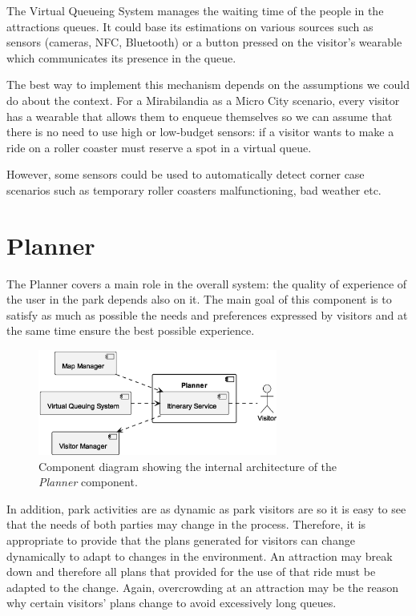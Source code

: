 The Virtual Queueing System manages the waiting time of the people in the attractions queues. It could base its estimations on various sources such
as sensors (cameras, NFC, Bluetooth) or a button pressed on the visitor's wearable which communicates its presence in the queue.

The best way to implement this mechanism depends on the assumptions we could do about the context.
For a Mirabilandia as a Micro City scenario, every visitor has a wearable that allows them to enqueue themselves so we can assume that there is no need to use high or low-budget sensors:
if a visitor wants to make a ride on a roller coaster must reserve a spot in a virtual queue.

However, some sensors could be used to automatically detect corner case scenarios such as temporary roller coasters malfunctioning, bad weather etc.

\section{Planner}\label{sec:planner}

The Planner covers a main role in the overall system: the quality of experience of the user in the park depends also on it. The main goal of this component is to satisfy as much as possible the needs and preferences expressed by visitors and at the same time ensure the best possible experience.

\begin{figure}[H]
	\centering
	\includegraphics[width=0.7\textwidth]{img/planner.eps}
	\caption{Component diagram showing the internal architecture of the \textit{Planner} component.}
	\label{fig:planner-arch}
\end{figure}

In addition, park activities are as dynamic as park visitors are so it is easy to see that the needs of both parties may change in the process.
Therefore, it is appropriate to provide that the plans generated for visitors can change dynamically to adapt to changes in the environment. An
attraction may break down and therefore all plans that provided for the use of that ride must be adapted to the change. Again, overcrowding at an
attraction may be the reason why certain visitors' plans change to avoid excessively long queues.

